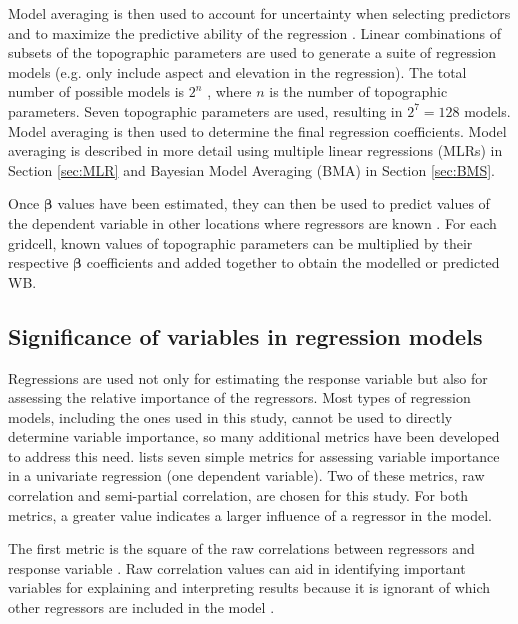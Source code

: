 \documentclass{sfuthesis}
\begin{document}
{Model averaging is then used to account for uncertainty when selecting predictors and to maximize the predictive ability of the regression \citep{Madigan1994}. Linear combinations of subsets of the topographic parameters are used to generate a suite of regression models (e.g. only include aspect and elevation in the regression). The total number of possible models is $2^n$ , where $n$ is the number of topographic parameters. Seven topographic parameters are used, resulting in $2^7 = 128$ models. Model averaging is then used to determine the final regression coefficients. Model averaging is described in more detail using multiple linear regressions (MLRs) in Section \ref{sec:MLR} and Bayesian Model Averaging (BMA) in Section \ref{sec:BMS}.

Once $\bm{\beta}$ values have been estimated, they can then be used to predict values of the dependent variable in other locations where regressors are known \citep{Davis1986}. For each gridcell, known values of topographic parameters can be multiplied by their respective $\bm{\beta}$ coefficients and added together to obtain the modelled or predicted WB.

\subsection{Significance of variables in regression models}

Regressions are used not only for estimating the response variable but also for assessing the relative importance of the regressors. Most types of regression models, including the ones used in this study, cannot be used to directly determine variable importance, so many additional metrics have been developed to address this need. \cite{Gromping2015} lists seven simple metrics for assessing variable importance in a univariate regression (one dependent variable). Two of these metrics, raw correlation and semi-partial correlation, are chosen for this study. For both metrics, a greater value indicates a larger influence of a regressor in the model.

The first metric is the square of the raw correlations between regressors and response variable \citep{Gromping2015}. Raw correlation values can aid in identifying important variables for explaining and interpreting results because it is ignorant of which other regressors are included in the model \citep{Darlington1968}. 

}
\end{document}
